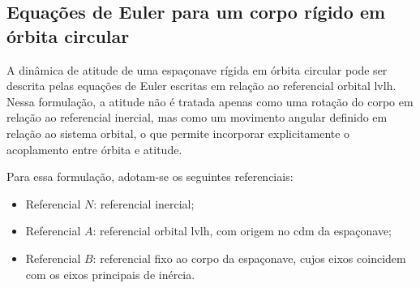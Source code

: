 


\subsection{Equações de Euler para um corpo rígido em órbita circular}
\label{sec_atitude_inercial}

A dinâmica de atitude de uma espaçonave rígida em órbita circular pode ser descrita pelas equações de Euler escritas em relação ao referencial orbital \gls{lvlh}. Nessa formulação, a atitude não é tratada apenas como uma rotação do corpo em relação ao referencial inercial, mas como um movimento angular definido em relação ao sistema orbital, o que permite incorporar explicitamente o acoplamento entre órbita e atitude.

Para essa formulação, adotam-se os seguintes referenciais:
\begin{itemize}
    \item Referencial $N$: referencial inercial;
    \item Referencial $A$: referencial orbital \gls{lvlh}, com origem no \gls{cdm} da espaçonave;
    \item Referencial $B$: referencial fixo ao corpo da espaçonave, cujos eixos coincidem com os eixos principais de inércia.
\end{itemize}

